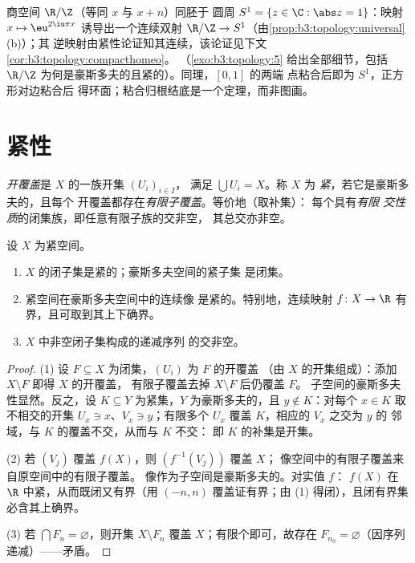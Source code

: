 \begin{example}\label{ex:b3:topology:circle}
商空间 $\R/\Z$（等同 $x$ 与 $x + n$）同胚于
圆周 $S^1 = \{z \in \C : \abs z = 1\}$：映射 $x
\mapsto \eu^{2\iu\pi x}$ 诱导出一个连续双射
$\R/\Z \to S^1$（由\cref{prop:b3:topology:universal}(b)）；其
逆映射由紧性论证知其连续，该论证见下文
\cref{cor:b3:topology:compacthomeo}。
（\cref{exo:b3:topology:5} 给出全部细节，包括
$\R/\Z$ 为何是豪斯多夫的且紧的）。同理，$[0,1]$ 的两端
点粘合后即为 $S^1$，正方形对边粘合后
得环面；粘合归根结底是一个定理，而非图画。
\end{example}

\section{紧性}

\begin{definition}\label{def:b3:topology:compact}
\emph{开覆盖}是 $X$ 的一族开集 $(U_i)_{i\in I}$，
满足 $\bigcup U_i = X$。称 $X$ 为
\emph{紧}，若它是豪斯多夫的，且每个
开覆盖都存在\emph{有限子覆盖}。等价地（取补集）：
每个具有\emph{有限
交性质}的闭集族，即任意有限子族的交非空，
其总交亦非空。
\end{definition}

\begin{theorem}[基本性质]\label{thm:b3:topology:compactprops}
设 $X$ 为紧空间。
\begin{enumerate}
  \item $X$ 的闭子集是紧的；豪斯多夫空间的紧子集
        是闭集。
  \item 紧空间在豪斯多夫空间中的连续像
        是紧的。特别地，连续映射 $f\colon X
        \to \R$ 有界，且可取到其上下确界。
  \item $X$ 中非空闭子集构成的递减序列
        的交非空。
\end{enumerate}
\end{theorem}

\begin{proof}
(1) 设 $F \subseteq X$ 为闭集，$(U_i)$ 为 $F$ 的开覆盖
（由 $X$ 的开集组成）：添加 $X \setminus F$ 即得 $X$ 的开覆盖，
有限子覆盖去掉 $X \setminus F$ 后仍覆盖 $F$。
子空间的豪斯多夫性显然。反之，设 $K \subseteq Y$
为紧集，$Y$ 为豪斯多夫的，且 $y \notin K$：对每个 $x \in K$
取不相交的开集 $U_x \ni x$、$V_x \ni y$；有限多个 $U_x$
覆盖 $K$，相应的 $V_x$ 之交为 $y$ 的
邻域，与 $K$ 的覆盖不交，从而与 $K$ 不交：
即 $K$ 的补集是开集。

(2) 若 $(V_j)$ 覆盖 $f(X)$，则 $(f^{-1}(V_j))$ 覆盖 $X$；
像空间中的有限子覆盖来自原空间中的有限子覆盖。
像作为子空间是豪斯多夫的。对实值 $f$：
$f(X)$ 在 $\R$ 中紧，从而既闭又有界（用
$(-n, n)$ 覆盖证有界；由 (1) 得闭），且闭有界集
必含其上确界。

(3) 若 $\bigcap F_n = \varnothing$，则开集 $X \setminus F_n$
覆盖 $X$；有限个即可，故存在 $F_{n_0} =
\varnothing$（因序列递减）——矛盾。
\end{proof}

